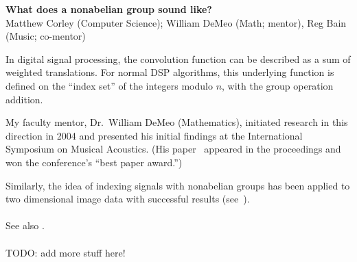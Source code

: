 \documentclass[10pt]{article}
\begin{document}
\begin{center}
{\bf What does a nonabelian group sound like?}\\
Matthew Corley (Computer Science); William DeMeo (Math; mentor), Reg
Bain (Music; co-mentor)
\end{center}

In digital signal processing, the convolution function can be described as a sum
of weighted translations.  For normal DSP algorithms, this underlying function
is defined on the ``index set'' of the integers modulo $n$, with the group operation
addition. 

My faculty mentor, Dr.~William DeMeo (Mathematics), initiated research in this
direction in 2004 and presented his initial findings at the International
Symposium on Musical Acoustics. (His paper~\cite{nonabeliandsp} appeared in the
proceedings and won the conference's ``best paper award.'')

Similarly, the idea of indexing signals with nonabelian groups has been applied
to two dimensional image data with successful results (see~\cite{Tolimieri:2003}).\\
\\
See also \cite{Tolimieri:1998}.\\
\\
TODO: add more stuff here!
 
\vskip5mm
\end{document}
